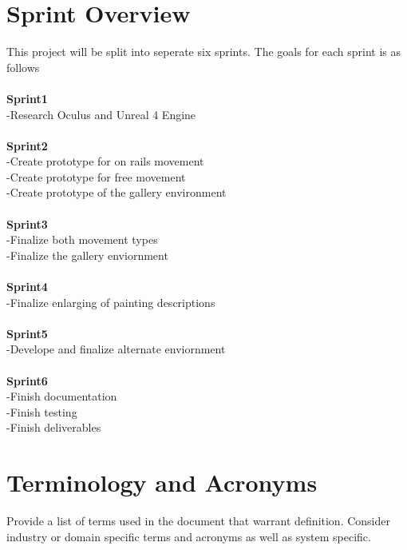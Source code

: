 \section{Sprint  Overview}
This project will be split into seperate six sprints. The goals for each sprint is as follows\\ \\
 \textbf{Sprint1}\\
-Research Oculus and Unreal 4 Engine\\ \\
 \textbf{Sprint2}\\
-Create prototype for on rails movement\\
-Create prototype for free movement\\
-Create prototype of the gallery environment\\ \\
 \textbf{Sprint3}\\
-Finalize both movement types\\
-Finalize the gallery enviornment\\ \\
 \textbf{Sprint4}\\
-Finalize enlarging of painting descriptions\\ \\
 \textbf{Sprint5}\\
-Develope and finalize alternate enviornment\\ \\
 \textbf{Sprint6}\\
-Finish documentation\\ 
-Finish testing\\
-Finish deliverables\\



\section{Terminology and Acronyms}
Provide a list of terms used in the document that warrant definition.  Consider 
industry or domain specific terms and acronyms as well as system specific. 

